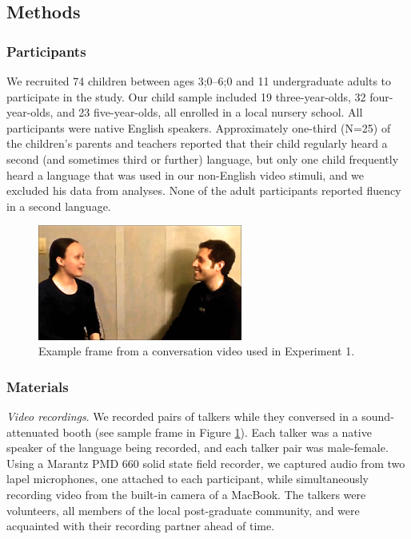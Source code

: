 \documentclass[authoryear, 12pt]{elsarticle}
\begin{document}
\subsection{Methods}
\label{sec:methods1}

\subsubsection{Participants}

We recruited 74 children between ages 3;0--6;0 and 11 undergraduate adults to participate in the study. Our child sample included 19 three-year-olds, 32 four-year-olds, and 23 five-year-olds, all enrolled in a local nursery school. All participants were native English speakers. Approximately one-third (N=25) of the children's parents and teachers reported that their child regularly heard a second (and sometimes third or further) language, but only one child frequently heard a language that was used in our non-English video stimuli, and we excluded his data from analyses. None of the adult participants reported fluency in a second language.

\begin{figure}[t]
\begin{center}
\includegraphics[width=0.6\textwidth]{figures/FIG-FL-stim.png}
\end{center}
\caption{Example frame from a conversation video used in Experiment 1.} 
\label{fig:speakers}
\end{figure}

\subsubsection{Materials}

\textit{Video recordings}. We recorded pairs of talkers while they conversed in a sound-attenuated booth (see sample frame in Figure \ref{fig:speakers}). Each talker was a native speaker of the language being recorded, and each talker pair was male-female. Using a Marantz PMD 660 solid state field recorder, we captured audio from two lapel microphones, one attached to each participant, while simultaneously recording video from the built-in camera of a MacBook. The talkers were volunteers, all members of the local post-graduate community, and were acquainted with their recording partner ahead of time. 
\end{document}
